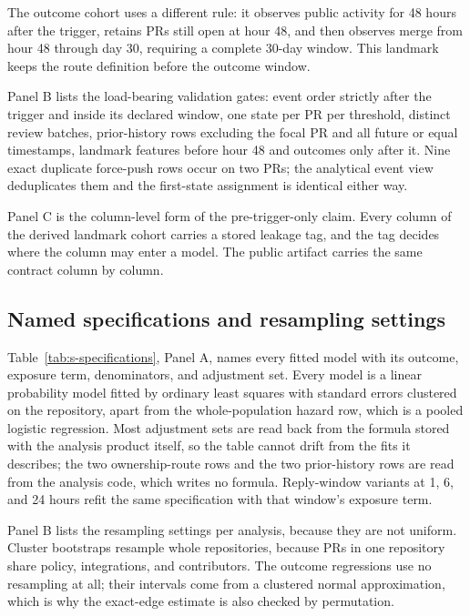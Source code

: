 \documentclass[pdflatex,sn-basic]{sn-jnl}
\begin{document}
The outcome cohort uses a different rule: it observes public activity for 48
hours after the trigger, retains PRs still open at hour 48, and then observes
merge from hour 48 through day 30, requiring a complete 30-day window. This
landmark keeps the route definition before the outcome window.

Panel B lists the load-bearing validation gates: event order strictly after the
trigger and inside its declared window, one state per PR per threshold, distinct
review batches, prior-history rows excluding the focal PR and all future or
equal timestamps, landmark features before hour 48 and outcomes only after it.
Nine exact duplicate force-push rows occur on two PRs; the analytical event view
deduplicates them and the first-state assignment is identical either way.

Panel C is the column-level form of the pre-trigger-only claim. Every column of
the derived landmark cohort carries a stored leakage tag, and the tag decides
where the column may enter a model. The public artifact carries the same
contract column by column.

\subsection{Named specifications and resampling settings}\label{app:specifications}

Table~\ref{tab:s-specifications}, Panel A, names every fitted model with its
outcome, exposure term, denominators, and adjustment set. Every model is a
linear probability model fitted by ordinary least squares with standard errors
clustered on the repository, apart from the whole-population hazard row, which is
a pooled logistic regression. Most adjustment sets are read back from the formula
stored with the analysis product itself, so the table cannot drift from the fits
it describes; the two ownership-route rows and the two prior-history rows are
read from the analysis code, which writes no formula. Reply-window variants at
1, 6, and 24 hours refit the same specification with that window's exposure
term.

Panel B lists the resampling settings per analysis, because they are not
uniform. Cluster bootstraps resample whole repositories, because PRs in one
repository share policy, integrations, and contributors. The outcome regressions
use no resampling at all; their intervals come from a clustered normal
approximation, which is why the exact-edge estimate is also checked by
permutation.
\end{document}
